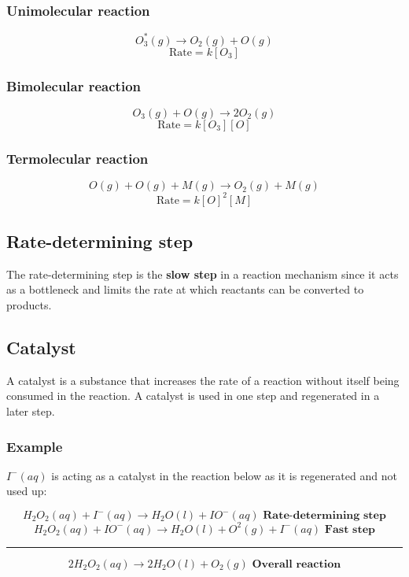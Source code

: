 \documentclass[11pt]{article}
\begin{document}
\subsubsection{Unimolecular reaction}
\label{sec:org8dae514}
\[O_3^* (g) \rightarrow O_2 (g) + O (g)\]
\[\text{Rate} = k[O_3]\]

\subsubsection{Bimolecular reaction}
\label{sec:org42c9aeb}
\[O_3 (g) + O (g) \rightarrow 2O_2 (g)\]
\[\text{Rate} = k[O_3][O]\]

\subsubsection{Termolecular reaction}
\label{sec:org9510b29}
\[O (g) + O (g) + M (g) \rightarrow O_2 (g) + M (g)\]
\[\text{Rate} = k[O]^2[M]\]

\subsection{Rate-determining step}
\label{sec:org9d1f540}
The rate-determining step is the \textbf{slow step} in a reaction mechanism since it acts as a bottleneck and limits the rate at which reactants can be converted to products.

\newpage

\subsection{Catalyst}
\label{sec:orgc3db480}
A catalyst is a substance that increases the rate of a reaction without itself being consumed in the reaction. A catalyst is used in one step and regenerated in a later step.

\subsubsection{Example}
\label{sec:orga61bc14}
\(I^- (aq)\) is acting as a catalyst in the reaction below as it is regenerated and not used up:

\[H_2 O_2 (aq) + I^- (aq) \rightarrow H_2O (l) + IO^- (aq) \textbf{ Rate-determining step}\]
\[H_2 O_2 (aq) + IO^- (aq) \rightarrow H_2O (l) + O^2 (g) + I^- (aq) \textbf{ Fast step}\]
\hrule
\[2H_2O_2 (aq) \rightarrow 2H_2O (l) + O_2 (g) \textbf{ Overall reaction}\]
\\[0pt]
\end{document}
